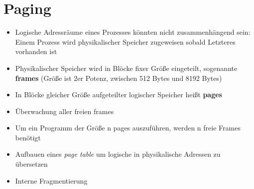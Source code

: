 \documentclass[a4paper]{scrreprt}
\begin{document}
\section{Paging}
\begin{itemize}
\item Logische Adressräume eines Prozesses könnten nicht zusammenhängend sein: Einem Prozess wird physikalischer Speicher zugeweisen sobald Letzteres vorhanden ist
\item Physikalischer Speicher wird in Blöcke fixer Größe eingeteilt, sogenannte \textbf{frames} (Größe ist 2er Potenz, zwischen 512 Bytes und 8192 Bytes)
\item In Blöcke gleicher Größe aufgeteilter logischer Speicher heißt \textbf{pages}
\item Überwachung aller freien frames
\item Um ein Programm der Größe n pages auszuführen, werden n freie Frames benötigt
\item Aufbauen eines \textit{page table} um logische in physikalische Adressen zu übersetzen
\item Interne Fragmentierung
\end{itemize}
\end{document}
